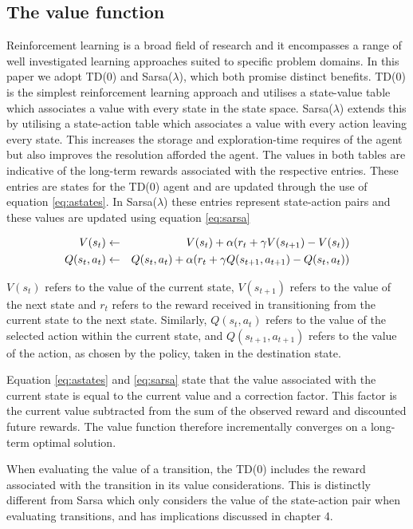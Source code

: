 \documentclass{rucsthesis}
\begin{document}
\subsection{The value function \label{sec:valfunc}}

Reinforcement learning is a broad field of research and it encompasses a range of well investigated learning approaches suited to specific problem domains. In this paper we adopt TD(0) and Sarsa($\lambda$), which both promise distinct benefits. TD(0) is the simplest reinforcement learning approach and utilises a state-value table which associates a value with every state in the state space. Sarsa($\lambda$) extends this by utilising a state-action table which associates a value with every action leaving every state. This increases the storage and exploration-time requires of the agent but also improves the resolution afforded the agent. The values in both tables are indicative of the long-term rewards associated with the respective entries. These entries are states for the TD(0) agent and are updated through the use of equation \ref{eq:astates}. In Sarsa($\lambda$) these entries represent state-action pairs and these values are updated using equation \ref{eq:sarsa}

\begin{eqnarray}
\centering
V(s_t) & \leftarrow & V(s_t) + \alpha(r_{t} + \gamma V(s_{t+1}) - V(s_t)) \label{eq:astates} \\
Q(s_t,a_t) & \leftarrow & Q(s_t,a_t) + \alpha(r_{t} + \gamma Q(s_{t+1},a_{t+1}) - Q(s_t,a_t)) \label{eq:sarsa}
\end{eqnarray}

$V(s_t)$ refers to the value of the current state, $V(s_{t+1})$ refers to the value of the next state and $r_t$ refers to the reward received in transitioning from the current state to the next state. Similarly, $Q(s_t,a_t)$ refers to the value of the selected action within the current state, and $Q(s_{t+1},a_{t+1})$ refers to the value of the action, as chosen by the policy, taken in the destination state.

Equation \ref{eq:astates} and \ref{eq:sarsa} state that the value associated with the current state is equal to the current value and a correction factor. This factor is the current value subtracted from the sum of the observed reward and discounted future rewards. The value function therefore incrementally converges on a long-term optimal solution.

When evaluating the value of a transition, the TD(0) includes the reward associated with the transition in its value considerations. This is distinctly different from Sarsa which only considers the value of the state-action pair when evaluating transitions, and has implications discussed in chapter 4.
\end{document}
